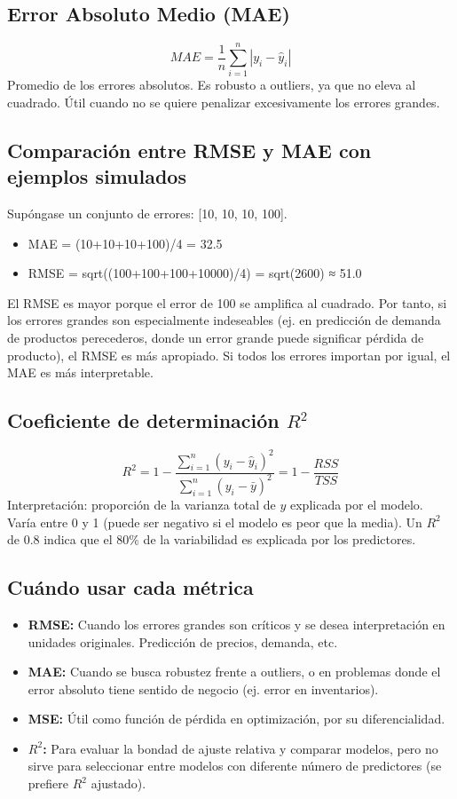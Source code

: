 \documentclass[12pt,a4paper,openany,oneside]{book}
\begin{document}
\subsection{Error Absoluto Medio (MAE)}
\[
MAE = \frac{1}{n} \sum_{i=1}^n |y_i - \hat{y}_i|
\]
Promedio de los errores absolutos. Es robusto a outliers, ya que no eleva al cuadrado. Útil cuando no se quiere penalizar excesivamente los errores grandes.

\subsection{Comparación entre RMSE y MAE con ejemplos simulados}
Supóngase un conjunto de errores: [10, 10, 10, 100].
\begin{itemize}
    \item MAE = (10+10+10+100)/4 = 32.5
    \item RMSE = sqrt((100+100+100+10000)/4) = sqrt(2600) ≈ 51.0
\end{itemize}
El RMSE es mayor porque el error de 100 se amplifica al cuadrado. Por tanto, si los errores grandes son especialmente indeseables (ej. en predicción de demanda de productos perecederos, donde un error grande puede significar pérdida de producto), el RMSE es más apropiado. Si todos los errores importan por igual, el MAE es más interpretable.

\subsection{Coeficiente de determinación \(R^2\)}
\[
R^2 = 1 - \frac{\sum_{i=1}^n (y_i - \hat{y}_i)^2}{\sum_{i=1}^n (y_i - \bar{y})^2} = 1 - \frac{RSS}{TSS}
\]
Interpretación: proporción de la varianza total de \(y\) explicada por el modelo. Varía entre 0 y 1 (puede ser negativo si el modelo es peor que la media). Un \(R^2\) de 0.8 indica que el 80\% de la variabilidad es explicada por los predictores.

\subsection{Cuándo usar cada métrica}
\begin{itemize}
    \item \textbf{RMSE:} Cuando los errores grandes son críticos y se desea interpretación en unidades originales. Predicción de precios, demanda, etc.
    \item \textbf{MAE:} Cuando se busca robustez frente a outliers, o en problemas donde el error absoluto tiene sentido de negocio (ej. error en inventarios).
    \item \textbf{MSE:} Útil como función de pérdida en optimización, por su diferencialidad.
    \item \textbf{\(R^2\):} Para evaluar la bondad de ajuste relativa y comparar modelos, pero no sirve para seleccionar entre modelos con diferente número de predictores (se prefiere \(R^2\) ajustado).
\end{itemize}
\end{document}
